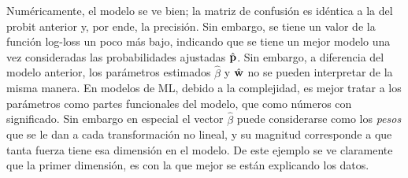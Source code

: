 \documentclass[../Main/Main.tex]{subfiles}
\begin{document}
Numéricamente, el modelo se ve bien; la matriz de confusión es idéntica a la del probit anterior y, por ende, la precisión. Sin embargo, se tiene un valor de la función log-loss un poco más bajo, indicando que se tiene un mejor modelo una vez consideradas las probabilidades ajustadas $\hat{\mathbf{p}}$. Sin embargo, a diferencia del modelo anterior, los parámetros estimados $\hat{\beta}$ y $\hat{\mathbf{w}}$ no se pueden interpretar de la misma manera. En modelos de ML, debido a la complejidad, es mejor tratar a los parámetros como partes funcionales del modelo, que como números con significado. Sin embargo en especial el vector $\hat{\beta}$ puede considerarse como los \textit{pesos} que se le dan a cada transformación no lineal, y su magnitud corresponde a que tanta fuerza tiene esa dimensión en el modelo. De este ejemplo se ve claramente que la primer dimensión, es con la que mejor se están explicando los datos.
\end{document}
